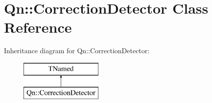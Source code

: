 \hypertarget{classQn_1_1CorrectionDetector}{}\section{Qn\+:\+:Correction\+Detector Class Reference}
\label{classQn_1_1CorrectionDetector}
Inheritance diagram for Qn\+:\+:Correction\+Detector\+:\begin{figure}[H]
\begin{center}
\leavevmode
\includegraphics[height=2.000000cm]{classQn_1_1CorrectionDetector}
\end{center}
\end{figure}
